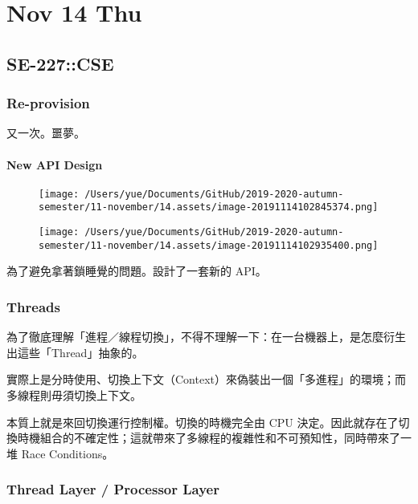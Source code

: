 \documentclass[
]{article}
\date{}
\begin{document}
\hypertarget{header-n0}{%
\section{Nov 14 Thu}\label{header-n0}}

\hypertarget{header-n2}{%
\subsection{SE-227::CSE}\label{header-n2}}

\hypertarget{header-n3}{%
\subsubsection{Re-provision}\label{header-n3}}

又一次。噩夢。

\hypertarget{header-n5}{%
\paragraph{New API Design}\label{header-n5}}

\begin{figure}
\centering
\texttt{[image: /Users/yue/Documents/GitHub/2019-2020-autumn-semester/11-november/14.assets/image-20191114102845374.png]}
\caption{}
\end{figure}

\begin{figure}
\centering
\texttt{[image: /Users/yue/Documents/GitHub/2019-2020-autumn-semester/11-november/14.assets/image-20191114102935400.png]}
\caption{}
\end{figure}

為了避免拿著鎖睡覺的問題。設計了一套新的 API。

\hypertarget{header-n9}{%
\subsubsection{Threads}\label{header-n9}}

為了徹底理解「進程／線程切換」，不得不理解一下：在一台機器上，是怎麼衍生出這些「Thread」抽象的。

實際上是分時使用、切換上下文（Context）來偽裝出一個「多進程」的環境；而多線程則毋須切換上下文。

本質上就是來回切換運行控制權。切換的時機完全由 CPU
決定。因此就存在了切換時機組合的不確定性；這就帶來了多線程的複雜性和不可預知性，同時帶來了一堆
Race Conditions。

\hypertarget{header-n13}{%
\subsubsection{Thread Layer / Processor Layer}\label{header-n13}}
\end{document}
